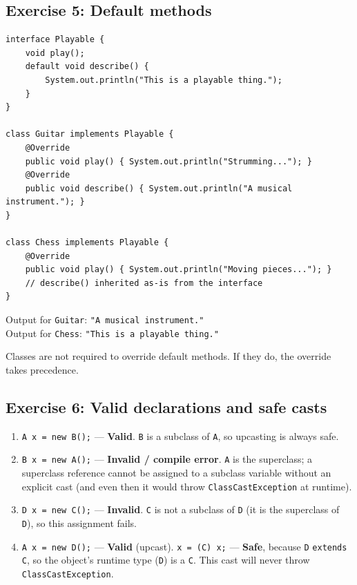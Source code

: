 \documentclass[twoside=false,DIV=14]{scrartcl}
\begin{document}
\subsection*{Exercise 5: Default methods}

\begin{lstlisting}
interface Playable {
    void play();
    default void describe() {
        System.out.println("This is a playable thing.");
    }
}

class Guitar implements Playable {
    @Override
    public void play() { System.out.println("Strumming..."); }
    @Override
    public void describe() { System.out.println("A musical instrument."); }
}

class Chess implements Playable {
    @Override
    public void play() { System.out.println("Moving pieces..."); }
    // describe() inherited as-is from the interface
}
\end{lstlisting}

Output for \texttt{Guitar}: \texttt{"A musical instrument."} \\
Output for \texttt{Chess}: \texttt{"This is a playable thing."}

Classes are not required to override default methods.  If they do, the override takes precedence.

\subsection*{Exercise 6: Valid declarations and safe casts}

\begin{enumerate}
    \item \texttt{A x = new B();} --- \textbf{Valid}. \texttt{B} is a subclass of \texttt{A}, so upcasting is always safe.
    \item \texttt{B x = new A();} --- \textbf{Invalid / compile error}. \texttt{A} is the superclass; a superclass reference cannot be assigned to a subclass variable without an explicit cast (and even then it would throw \texttt{ClassCastException} at runtime).
    \item \texttt{D x = new C();} --- \textbf{Invalid}. \texttt{C} is not a subclass of \texttt{D} (it is the superclass of \texttt{D}), so this assignment fails.
    \item \texttt{A x = new D();} --- \textbf{Valid} (upcast).  \texttt{x = (C) x;} --- \textbf{Safe}, because \texttt{D} \texttt{extends} \texttt{C}, so the object's runtime type (\texttt{D}) is a \texttt{C}.  This cast will never throw \texttt{ClassCastException}.
\end{enumerate}
\end{document}
